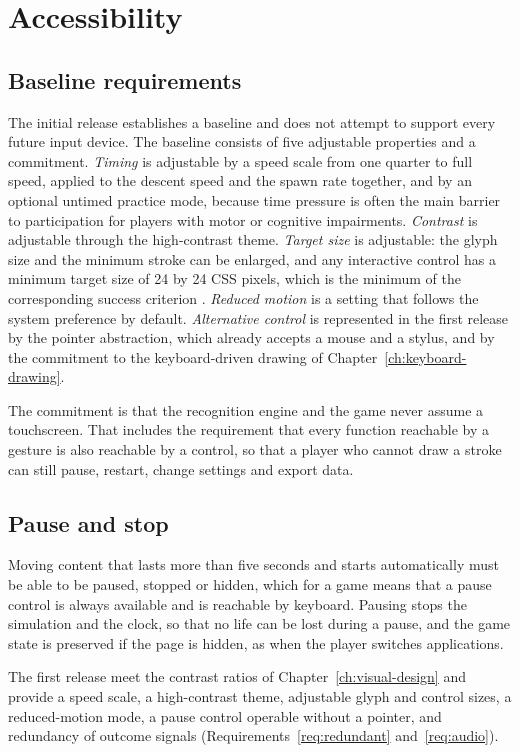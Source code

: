\chapter{Accessibility}\label{ch:accessibility}

\section{Baseline requirements}

The initial release establishes a baseline and does not attempt to support every future input device. The baseline consists of five adjustable properties and a commitment. \emph{Timing} is adjustable by a speed scale from one quarter to full speed, applied to the descent speed and the spawn rate together, and by an optional untimed practice mode, because time pressure is often the main barrier to participation for players with motor or cognitive impairments. \emph{Contrast} is adjustable through the high-contrast theme. \emph{Target size} is adjustable: the glyph size and the minimum stroke can be enlarged, and any interactive control has a minimum target size of 24 by 24 CSS pixels, which is the minimum of the corresponding success criterion \cite{wcag22}.\evD{} \emph{Reduced motion} is a setting that follows the system preference by default. \emph{Alternative control} is represented in the first release by the pointer abstraction, which already accepts a mouse and a stylus, and by the commitment to the keyboard-driven drawing of Chapter~\ref{ch:keyboard-drawing}.

The commitment is that the recognition engine and the game never assume a touchscreen. That includes the requirement that every function reachable by a gesture is also reachable by a control, so that a player who cannot draw a stroke can still pause, restart, change settings and export data.

\section{Pause and stop}

Moving content that lasts more than five seconds and starts automatically must be able to be paused, stopped or hidden, which for a game means that a pause control is always available and is reachable by keyboard.\evD{} Pausing stops the simulation and the clock, so that no life can be lost during a pause, and the game state is preserved if the page is hidden, as when the player switches applications.

\begin{requirement}\label{req:a11y}
The first release \must{} meet the contrast ratios of Chapter~\ref{ch:visual-design} and \must{} provide a speed scale, a high-contrast theme, adjustable glyph and control sizes, a reduced-motion mode, a pause control operable without a pointer, and redundancy of outcome signals (Requirements~\ref{req:redundant} and~\ref{req:audio}).\evS
\end{requirement}
